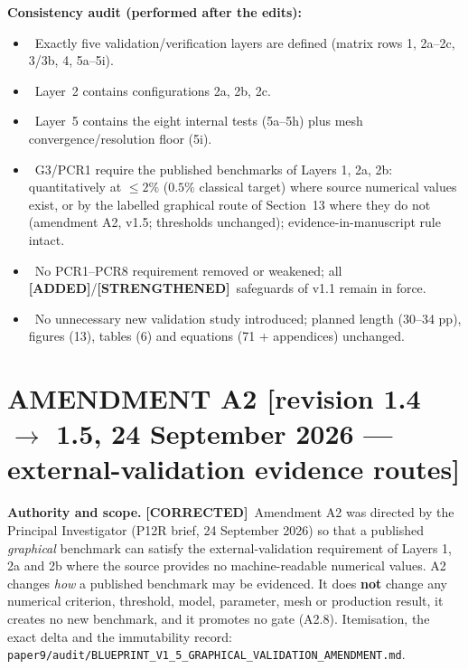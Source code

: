 \documentclass[11pt,a4paper]{article}
\newcommand{\bp}[1]{\textcolor{accent}{\textsf{\footnotesize [#1]}}}
\newcommand{\ADDED}{{\color{addcol}\textbf{[ADDED]}}}
\newcommand{\STR}{{\color{strcol}\textbf{[STRENGTHENED]}}}
\newcommand{\COR}{{\color{corcol}\textbf{[CORRECTED]}}}
\newcommand{\YES}{\textcolor{ok}{\textbf{\checkmark}}}
\begin{document}
\medskip
\textbf{Consistency audit (performed after the edits):}
\begin{itemize}
\item \YES\ Exactly five validation/verification layers are defined (matrix rows 1, 2a--2c, 3/3b, 4, 5a--5i).
\item \YES\ Layer~2 contains configurations 2a, 2b, 2c.
\item \YES\ Layer~5 contains the eight internal tests (5a--5h) plus mesh convergence/resolution floor (5i).
\item \YES\ G3/PCR1 require the published benchmarks of Layers 1, 2a, 2b: quantitatively at $\le2\%$ ($0.5\%$ classical target) where source numerical values exist, or by the labelled graphical route of Section~13 where they do not (amendment A2, v1.5; thresholds unchanged); evidence-in-manuscript rule intact. \\
\item \YES\ No PCR1--PCR8 requirement removed or weakened; all \ADDED/\STR\ safeguards of v1.1 remain in force.
\item \YES\ No unnecessary new validation study introduced; planned length (30--34 pp), figures (13), tables (6) and equations (71 + appendices) unchanged.
\end{itemize}


\section{AMENDMENT A2 \bp{revision 1.4 $\to$ 1.5, 24 September 2026 --- external-validation evidence routes}}

\textbf{Authority and scope.} \COR\ Amendment A2 was directed by the Principal Investigator (P12R brief,
24 September 2026) so that a published \emph{graphical} benchmark can satisfy the external-validation
requirement of Layers 1, 2a and 2b where the source provides no machine-readable numerical values. A2
changes \emph{how} a published benchmark may be evidenced. It does \textbf{not} change any numerical
criterion, threshold, model, parameter, mesh or production result, it creates no new benchmark, and it
promotes no gate (A2.8). Itemisation, the exact delta and the immutability record:
\texttt{paper9/audit/BLUEPRINT\_V1\_5\_GRAPHICAL\_VALIDATION\_AMENDMENT.md}.
\end{document}
